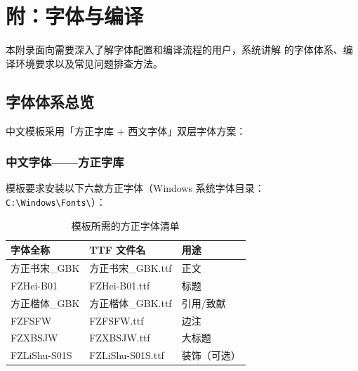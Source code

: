 
\setchapterpreamble[u]{\margintoc}
\chapter{附：字体与编译}

本附录面向需要深入了解字体配置和编译流程的用户，系统讲解
 的字体体系、编译环境要求以及常见问题排查方法。


\section{字体体系总览}


 中文模板采用「方正字库 + 西文字体」双层字体方案：

\subsection{中文字体——方正字库}

模板要求安装以下六款方正字体（Windows 系统字体目录：
\lstinline|C:\Windows\Fonts\|）：

\begin{table}[h]
\centering
\caption{模板所需的方正字体清单}
\begin{tabular}{@{}lll@{}}
\toprule
字体全称 & TTF 文件名 & 用途 \\
\midrule
方正书宋\_GBK  & 方正书宋\_GBK.ttf & 正文 \\
FZHei-B01       & FZHei-B01.ttf    & 标题 \\
方正楷体\_GBK   & 方正楷体\_GBK.ttf & 引用/致献 \\
FZFSFW          & FZFSFW.ttf       & 边注 \\
FZXBSJW         & FZXBSJW.ttf      & 大标题 \\
FZLiShu-S01S    & FZLiShu-S01S.ttf & 装饰（可选）\\
\bottomrule
\end{tabular}
\end{table}


